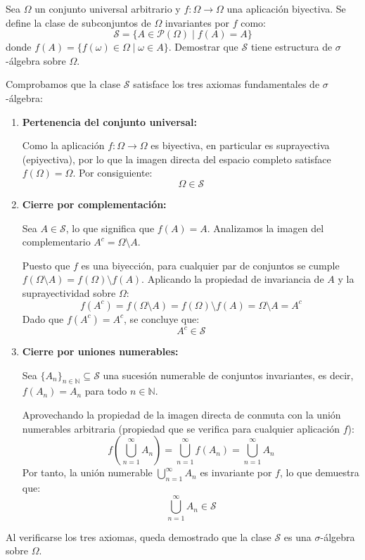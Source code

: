 \newpage
\begin{problema}
Sea $\Omega$ un conjunto universal arbitrario y $f : \Omega \to \Omega$ una aplicación biyectiva. Se define la clase de subconjuntos de $\Omega$ invariantes por $f$ como:
\[
    \mathcal{S} = \{ A \in \mathcal{P}(\Omega) \mid f(A) = A \}
\]
donde $f(A) = \{ f(\omega) \in \Omega \mid \omega \in A \}$. Demostrar que $\mathcal{S}$ tiene estructura de $\sigma$-álgebra sobre $\Omega$.

\tcblower

Comprobamos que la clase $\mathcal{S}$ satisface los tres axiomas fundamentales de $\sigma$-álgebra:

\begin{enumerate}
    \item \textbf{Pertenencia del conjunto universal:}
    
    Como la aplicación $f : \Omega \to \Omega$ es biyectiva, en particular es suprayectiva (epiyectiva), por lo que la imagen directa del espacio completo satisface $f(\Omega) = \Omega$. Por consiguiente:
    \[
        \Omega \in \mathcal{S}
    \]

    \item \textbf{Cierre por complementación:}
    
    Sea $A \in \mathcal{S}$, lo que significa que $f(A) = A$. Analizamos la imagen del complementario $A^c = \Omega \setminus A$.
    
    Puesto que $f$ es una biyección, para cualquier par de conjuntos se cumple $f(\Omega \setminus A) = f(\Omega) \setminus f(A)$. Aplicando la propiedad de invariancia de $A$ y la suprayectividad sobre $\Omega$:
    \[
        f(A^c) = f(\Omega \setminus A) = f(\Omega) \setminus f(A) = \Omega \setminus A = A^c
    \]
    Dado que $f(A^c) = A^c$, se concluye que:
    \[
        A^c \in \mathcal{S}
    \]

    \item \textbf{Cierre por uniones numerables:}
    
    Sea $\{A_n\}_{n \in \mathbb{N}} \subseteq \mathcal{S}$ una sucesión numerable de conjuntos invariantes, es decir, $f(A_n) = A_n$ para todo $n \in \mathbb{N}$.
    
    Aprovechando la propiedad de la imagen directa de conmuta con la unión numerables arbitraria (propiedad que se verifica para cualquier aplicación $f$):
    \[
        f\left( \bigcup_{n=1}^\infty A_n \right) = \bigcup_{n=1}^\infty f(A_n) = \bigcup_{n=1}^\infty A_n
    \]
    Por tanto, la unión numerable $\bigcup_{n=1}^\infty A_n$ es invariante por $f$, lo que demuestra que:
    \[
        \bigcup_{n=1}^\infty A_n \in \mathcal{S}
    \]
\end{enumerate}

Al verificarse los tres axiomas, queda demostrado que la clase $\mathcal{S}$ es una $\sigma$-álgebra sobre $\Omega$.
\end{problema}
